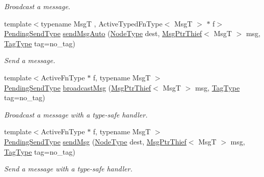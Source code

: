 \begin{DoxyCompactItemize}
\begin{DoxyCompactList}\small\item\em Broadcast a message. \end{DoxyCompactList}\item 
{\footnotesize template$<$typename MsgT , Active\+Typed\+Fn\+Type$<$ Msg\+T $>$ $\ast$ f$>$ }\\\hyperlink{structvt_1_1messaging_1_1_active_messenger_a3626a6ca76d8ad4ec7c3b47a2c70d3a8}{Pending\+Send\+Type} \hyperlink{group__typesafehan_ga9e67738f189123c256172ce9e22a8b68}{send\+Msg\+Auto} (\hyperlink{namespacevt_a866da9d0efc19c0a1ce79e9e492f47e2}{Node\+Type} dest, \hyperlink{structvt_1_1messaging_1_1_msg_ptr_thief}{Msg\+Ptr\+Thief}$<$ MsgT $>$ msg, \hyperlink{namespacevt_a84ab281dae04a52a4b243d6bf62d0e52}{Tag\+Type} tag=no\+\_\+tag)
\begin{DoxyCompactList}\small\item\em Send a message. \end{DoxyCompactList}\item 
{\footnotesize template$<$Active\+Fn\+Type $\ast$ f, typename MsgT $>$ }\\\hyperlink{structvt_1_1messaging_1_1_active_messenger_a3626a6ca76d8ad4ec7c3b47a2c70d3a8}{Pending\+Send\+Type} \hyperlink{group__basicsend_ga06f3b2d69156852600ead958ae95e3c9}{broadcast\+Msg} (\hyperlink{structvt_1_1messaging_1_1_msg_ptr_thief}{Msg\+Ptr\+Thief}$<$ MsgT $>$ msg, \hyperlink{namespacevt_a84ab281dae04a52a4b243d6bf62d0e52}{Tag\+Type} tag=no\+\_\+tag)
\begin{DoxyCompactList}\small\item\em Broadcast a message with a type-\/safe handler. \end{DoxyCompactList}\item 
{\footnotesize template$<$Active\+Fn\+Type $\ast$ f, typename MsgT $>$ }\\\hyperlink{structvt_1_1messaging_1_1_active_messenger_a3626a6ca76d8ad4ec7c3b47a2c70d3a8}{Pending\+Send\+Type} \hyperlink{group__basicsend_gaab0dc380a72f038f4fc2350ba89de98f}{send\+Msg} (\hyperlink{namespacevt_a866da9d0efc19c0a1ce79e9e492f47e2}{Node\+Type} dest, \hyperlink{structvt_1_1messaging_1_1_msg_ptr_thief}{Msg\+Ptr\+Thief}$<$ MsgT $>$ msg, \hyperlink{namespacevt_a84ab281dae04a52a4b243d6bf62d0e52}{Tag\+Type} tag=no\+\_\+tag)
\begin{DoxyCompactList}\small\item\em Send a message with a type-\/safe handler. \end{DoxyCompactList}\item 

\end{DoxyCompactItemize}
